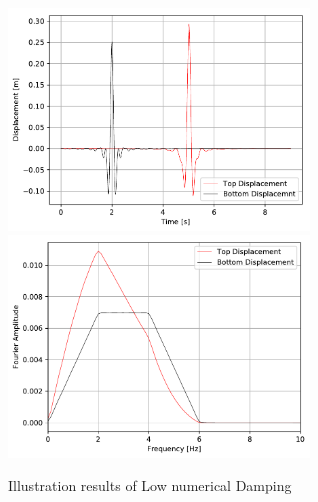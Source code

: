 \begin{figure}[H]
  \centering
  \includegraphics[width = 8cm]{./Figure-files/Day3/Numerical_Damping_Example/newmark06Displacement.pdf}
  \includegraphics[width = 8cm]{./Figure-files/Day3/Numerical_Damping_Example/newmark06Displacement_Spectrum.pdf}
  \caption{Illustration results of Low numerical Damping}
  \label{fig_day3_numerical_damping}
\end{figure}

